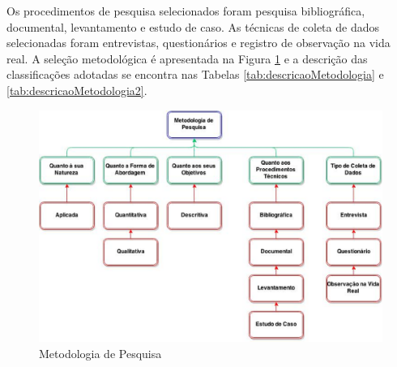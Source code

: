 Os procedimentos de pesquisa selecionados foram pesquisa bibliográfica, documental, levantamento e estudo de caso. As técnicas de coleta de dados selecionadas foram
entrevistas, questionários e registro de observação na vida real. A seleção metodológica é apresentada na Figura \ref{7eixosqualidade} e a descrição das classificações adotadas se encontra nas Tabelas \ref{tab:descricaoMetodologia} e \ref{tab:descricaoMetodologia2}.

\begin{figure}[h!]
\centering
\includegraphics[keepaspectratio=false,scale=0.5]{figuras/figuras_nilton/selecaoMetodologica.eps}
\caption{Metodologia de Pesquisa}
\label{7eixosqualidade}
\end{figure}

\begin{table}[!ht]
	\begin{center}
	
	 
	\caption{Descrição das classificações adotadas de pesquisa, conceitos extraídos de   parte 1.}
	\label{tab:descricaoMetodologia}
	\end{center}
	\end{table}	
	\FloatBarrier
	
	
	
	\begin{table}[!ht]
	\begin{center}
	
	 
	\caption{Descrição das classificações adotadas de pesquisa, conceitos extraídos de   parte 2.}
	\label{tab:descricaoMetodologia2}
	\end{center}
	\end{table}	
	\FloatBarrier

